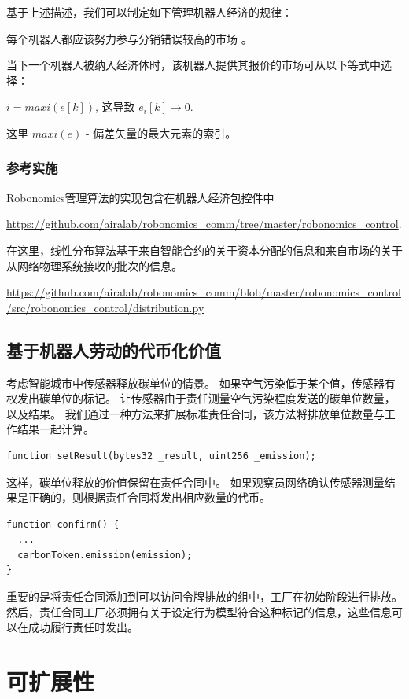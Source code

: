 \documentclass[UTF8]{article}
\begin{document}
基于上述描述，我们可以制定如下管理机器人经济的规律：

每个机器人都应该努力参与分销错误较高的市场 \cite{LonshakovSergey2017HowProtocol}。

当下一个机器人被纳入经济体时，该机器人提供其报价的市场可从以下等式中选择：

$ i = maxi(e[k])$, 这导致 $ e_i[k] \rightarrow 0 $.

这里 $ maxi(e) $ - 偏差矢量的最大元素的索引。

\subsubsection{参考实施}

Robonomics管理算法的实现包含在机器人经济包控件中

\url{https://github.com/airalab/robonomics_comm/tree/master/robonomics_control}. 

在这里，线性分布算法基于来自智能合约的关于资本分配的信息和来自市场的关于从网络物理系统接收的批次的信息。

\url{https://github.com/airalab/robonomics_comm/blob/master/robonomics_control/src/robonomics_control/distribution.py}

\subsection{基于机器人劳动的代币化价值}

考虑智能城市中传感器释放碳单位的情景。 如果空气污染低于某个值，传感器有权发出碳单位的标记。 让传感器由于责任测量空气污染程度发送的碳单位数量，以及结果。 我们通过一种方法来扩展标准责任合同，该方法将排放单位数量与工作结果一起计算。
\begin{lstlisting}
function setResult(bytes32 _result, uint256 _emission);
\end{lstlisting}

这样，碳单位释放的价值保留在责任合同中。 如果观察员网络确认传感器测量结果是正确的，则根据责任合同将发出相应数量的代币。

\begin{lstlisting}
function confirm() {
  ... 
  carbonToken.emission(emission);
}
\end{lstlisting}

重要的是将责任合同添加到可以访问令牌排放的组中，工厂在初始阶段进行排放。 然后，责任合同工厂必须拥有关于设定行为模型符合这种标记的信息，这些信息可以在成功履行责任时发出。

\section{可扩展性}
\end{document}

